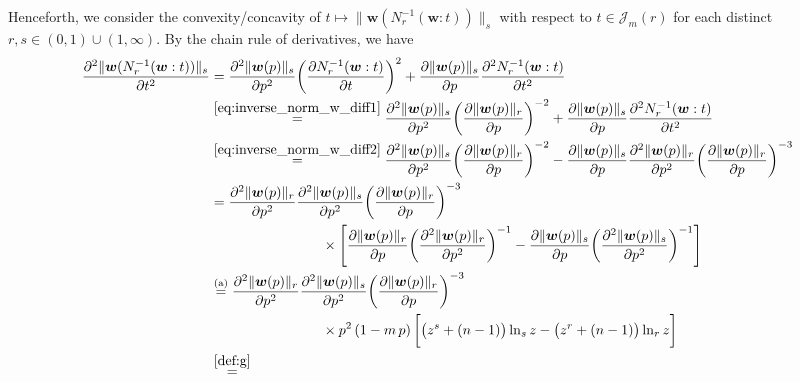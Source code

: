 \documentclass[conference, draftcls, onecolumn]{IEEEtran}
\theoremstyle{plain}
\newcommand{\bvec}[1]{\boldsymbol{#1}}
\newcommand{\lemref}[1]{Lemma~\ref{#1}}
\begin{document}
\begin{IEEEproof}[Proof of \lemref{lem:convex_w}]
Henceforth, we consider the convexity/concavity of $t \mapsto \| \bvec{w}( N_{r}^{-1}( \bvec{w} : t ) ) \|_{s}$ with respect to $t \in \mathcal{J}_{m}( r )$ for each distinct $r, s \in (0, 1) \cup (1, \infty)$.
By the chain rule of derivatives, we have
\begin{align}
\frac{ \partial^{2} \| \bvec{w}( N_{r}^{-1}( \bvec{w} : t ) ) \|_{s} }{ \partial t^{2} }
& =
\frac{ \partial^{2} \| \bvec{w}( p ) \|_{s} }{ \partial p^{2} } \bigg( \frac{ \partial N_{r}^{-1}( \bvec{w} : t ) }{ \partial t } \bigg)^{2} + \frac{ \partial \| \bvec{w}( p ) \|_{s} }{ \partial p } \frac{ \partial^{2} N_{r}^{-1}( \bvec{w} : t ) }{ \partial t^{2} }
\\
& \overset{\eqref{eq:inverse_norm_w_diff1}}{=}
\frac{ \partial^{2} \| \bvec{w}( p ) \|_{s} }{ \partial p^{2} } \bigg( \frac{ \partial \| \bvec{w}( p ) \|_{r} }{ \partial p } \bigg)^{-2} + \frac{ \partial \| \bvec{w}( p ) \|_{s} }{ \partial p } \frac{ \partial^{2} N_{r}^{-1}( \bvec{w} : t ) }{ \partial t^{2} }
\\
& \overset{\eqref{eq:inverse_norm_w_diff2}}{=}
\frac{ \partial^{2} \| \bvec{w}( p ) \|_{s} }{ \partial p^{2} } \bigg( \frac{ \partial \| \bvec{w}( p ) \|_{r} }{ \partial p } \bigg)^{-2} - \frac{ \partial \| \bvec{w}( p ) \|_{s} }{ \partial p } \frac{ \partial^{2} \| \bvec{w}( p ) \|_{r} }{ \partial p^{2} } \bigg( \frac{ \partial \| \bvec{w}( p ) \|_{r} }{ \partial p } \bigg)^{-3}
\\
& =
\frac{ \partial^{2} \| \bvec{w}( p ) \|_{r} }{ \partial p^{2} } \frac{ \partial^{2} \| \bvec{w}( p ) \|_{s} }{ \partial p^{2} } \bigg( \frac{ \partial \| \bvec{w}( p ) \|_{r} }{ \partial p } \bigg)^{-3}
\notag \\
& \qquad \qquad \qquad \qquad \times
\Bigg[ \frac{ \partial \| \bvec{w}( p ) \|_{r} }{ \partial p } \bigg( \frac{ \partial^{2} \| \bvec{w}( p ) \|_{r} }{ \partial p^{2} } \bigg)^{-1} - \frac{ \partial \| \bvec{w}( p ) \|_{s} }{ \partial p } \bigg( \frac{ \partial^{2} \| \bvec{w}( p ) \|_{s} }{ \partial p^{2} } \bigg)^{-1} \Bigg]
\\
& \overset{\text{(a)}}{=}
\frac{ \partial^{2} \| \bvec{w}( p ) \|_{r} }{ \partial p^{2} } \frac{ \partial^{2} \| \bvec{w}( p ) \|_{s} }{ \partial p^{2} } \bigg( \frac{ \partial \| \bvec{w}( p ) \|_{r} }{ \partial p } \bigg)^{-3}
\notag \\
& \qquad \qquad \qquad \qquad \times
p^{2} \, (1 - m \, p) \, \bigg[ \big( z^{s} + (n-1) \big) \ln_{s} z - \big( z^{r} + (n-1) \big) \ln_{r} z \bigg]
\\
& \overset{\eqref{def:g}}{=}

\end{align}
\end{IEEEproof}
\end{document}
